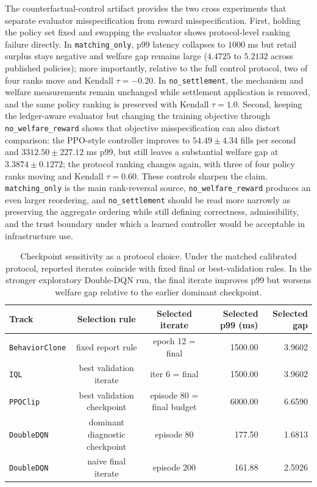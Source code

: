 \documentclass[11pt]{article}
\begin{document}
The counterfactual-control artifact provides the two cross experiments that separate evaluator misspecification from reward misspecification. First, holding the policy set fixed and swapping the evaluator shows protocol-level ranking failure directly. In \texttt{matching\_only}, p99 latency collapses to $1000$ ms but retail surplus stays negative and welfare gap remains large ($4.4725$ to $5.2132$ across published policies); more importantly, relative to the full control protocol, two of four ranks move and Kendall $\tau=-0.20$. In \texttt{no\_settlement}, the mechanism and welfare measurements remain unchanged while settlement application is removed, and the same policy ranking is preserved with Kendall $\tau=1.0$. Second, keeping the ledger-aware evaluator but changing the training objective through \texttt{no\_welfare\_reward} shows that objective misspecification can also distort comparison: the PPO-style controller improves to $54.49 \pm 4.34$ fills per second and $3312.50 \pm 227.12$ ms p99, but still leaves a substantial welfare gap at $3.3874 \pm 0.1272$; the protocol ranking changes again, with three of four policy ranks moving and Kendall $\tau=0.60$. These controls sharpen the claim. \texttt{matching\_only} is the main rank-reversal source, \texttt{no\_welfare\_reward} produces an even larger reordering, and \texttt{no\_settlement} should be read more narrowly as preserving the aggregate ordering while still defining correctness, admissibility, and the trust boundary under which a learned controller would be acceptable in infrastructure use.

\begin{table}[t]
\centering
\begin{tabular}{lccrr}
\toprule
Track & Selection rule & Selected iterate & Selected p99 (ms) & Selected gap \\
\midrule
\texttt{BehaviorClone} & fixed report rule & epoch 12 = final & 1500.00 & 3.9602 \\
\texttt{IQL} & best validation iterate & iter 6 = final & 1500.00 & 3.9602 \\
\texttt{PPOClip} & best validation checkpoint & episode 80 = final budget & 6000.00 & 6.6590 \\
\texttt{DoubleDQN} & dominant diagnostic checkpoint & episode 80 & 177.50 & 1.6813 \\
\texttt{DoubleDQN} & naive final iterate & episode 200 & 161.88 & 2.5926 \\
\bottomrule
\end{tabular}
\caption{Checkpoint sensitivity as a protocol choice. Under the matched calibrated protocol, reported iterates coincide with fixed final or best-validation rules. In the stronger exploratory Double-DQN run, the final iterate improves p99 but worsens welfare gap relative to the earlier dominant checkpoint.}
\label{tab:checkpointprotocol}
\end{table}
\end{document}
